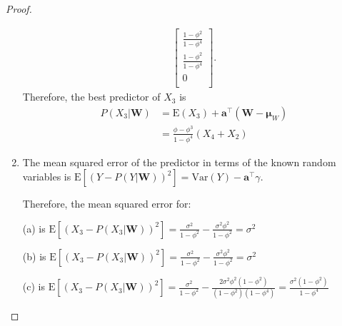 \documentclass[12pt]{article}
\theoremstyle{definition}
\newcommand{\E}{\text{E}}
\newcommand{\V}{\text{Var}}
\newcommand{\vect}[1]{\boldsymbol{#1}}
\begin{document}
\begin{proof}
\begin{enumerate}
\begin{align*}
\begin{bmatrix}
          \frac{1-\phi^2}{1-\phi^4} \\
          \frac{1-\phi^2}{1-\phi^4} \\
          0 \\
        \end{bmatrix}.
      \end{align*}
      Therefore, the best predictor of $X_3$ is
      \begin{align*}
        P(X_3|\vect{W}) &= \E(X_3) + \vect{a}^\intercal (\vect{W} - \vect{\mu}_W) \\
        &= \frac{\phi-\phi^3}{1-\phi^4}(X_4 + X_2)
      \end{align*}

    \item The mean squared error of the predictor in terms of the known random
      variables is $\E\left[ (Y - P(Y|\vect{W}))^2 \right] = \V(Y) - \vect{a}^\intercal \gamma$.

      Therefore, the mean squared error for:

      (a) is $\E\left[ (X_3 - P(X_3|\vect{W}))^2 \right] =
      \frac{\sigma^2}{1-\phi^2} - \frac{\sigma^2\phi^2}{1-\phi^2} = \sigma^2$

      (b) is $\E\left[ (X_3 - P(X_3|\vect{W}))^2 \right] =
      \frac{\sigma^2}{1-\phi^2} - \frac{\sigma^2\phi^2}{1-\phi^2} = \sigma^2$

      (c) is $\E\left[ (X_3 - P(X_3|\vect{W}))^2 \right] =
      \frac{\sigma^2}{1-\phi^2} - \frac{2\sigma^2\phi^2(1 - \phi^2)}{(1-\phi^2)(1-\phi^4)} = \frac{\sigma^2(1-\phi^2)}{1-\phi^4}$
  \end{enumerate}
\end{proof}
\end{document}
